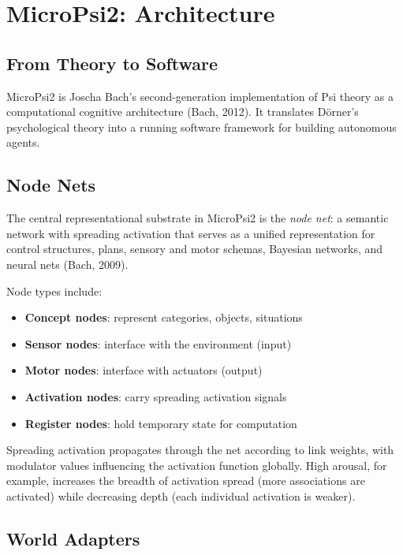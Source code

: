 \documentclass[11pt,letterpaper]{article}
\begin{document}
\section{MicroPsi2: Architecture}
\label{sec:micropsi2}

\subsection{From Theory to Software}

MicroPsi2 is Joscha Bach's second-generation implementation of Psi theory as
a computational cognitive architecture (Bach, 2012). It translates
D\"orner's psychological theory into a running software framework for
building autonomous agents.

\subsection{Node Nets}

The central representational substrate in MicroPsi2 is the \emph{node net}:
a semantic network with spreading activation that serves as a unified
representation for control structures, plans, sensory and motor schemas,
Bayesian networks, and neural nets (Bach, 2009).

Node types include:
\begin{itemize}
  \item \textbf{Concept nodes}: represent categories, objects, situations
  \item \textbf{Sensor nodes}: interface with the environment (input)
  \item \textbf{Motor nodes}: interface with actuators (output)
  \item \textbf{Activation nodes}: carry spreading activation signals
  \item \textbf{Register nodes}: hold temporary state for computation
\end{itemize}

Spreading activation propagates through the net according to link weights,
with modulator values influencing the activation function globally. High
arousal, for example, increases the breadth of activation spread (more
associations are activated) while decreasing depth (each individual
activation is weaker).

\subsection{World Adapters}
\end{document}
